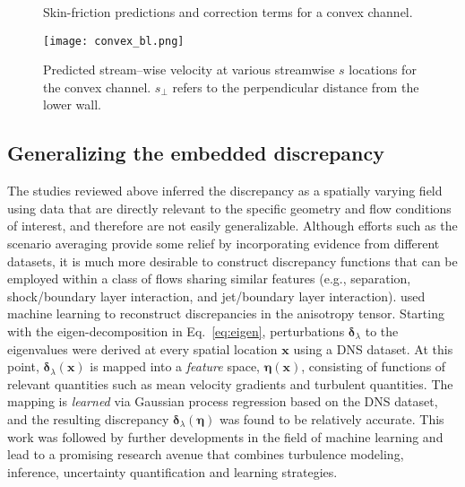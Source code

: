 \documentclass[a4paper]{ar-1col}
\begin{document}
 \begin{figure}
 \centering
 \begin{floatrow}
 \hspace{-2.2cm}
 \hspace{-2.7cm}
\end{floatrow}
\caption{Skin-friction predictions and correction terms for a convex channel.}
\label{fig:convex:sarccomp}
\end{figure}


\begin{figure*}
\centering
\texttt{[image: convex\_bl.png]}
\caption{Predicted stream--wise velocity at various streamwise $s$ locations  for the convex channel. $s_{\perp}$ refers to the perpendicular distance from the lower wall.}
\label{fig:convex:bl}
\end{figure*}

\subsection{Generalizing the embedded discrepancy}
The studies reviewed above inferred the discrepancy  as a spatially varying field using data that are directly relevant to the specific geometry and flow conditions of interest, and therefore  are not easily generalizable. Although efforts such as the scenario averaging \citep{edeling2014bayesian} provide some relief   by incorporating evidence from different datasets,  it is much more desirable to construct discrepancy functions that can be employed within a class of flows sharing similar features (e.g., separation, shock/boundary layer interaction, and jet/boundary layer interaction).
\citet{tracey2013application} used machine learning to reconstruct discrepancies in the anisotropy tensor. Starting with the eigen-decomposition in Eq.~\ref{eq:eigen}, perturbations $\bm{\delta}_{\lambda}$ to the eigenvalues  were derived at every spatial location $\bm{x}$ using a DNS dataset. At this point, $\bm{\delta}_{\lambda}(\bm{x})$ is mapped into a {\it feature} space, $\bm{\eta}(\bm{x})$, consisting
of functions of relevant quantities such as mean velocity gradients and turbulent quantities. The mapping is {\it learned} via Gaussian process regression based on the DNS dataset, and the resulting discrepancy  $\bm{\delta}_{\lambda}(\bm{\eta})$  was found  to
be relatively accurate.
 This work was followed by further developments  in the field of machine learning and lead to a promising research  avenue   that combines turbulence modeling, inference, uncertainty quantification and learning strategies.
 
\end{document}

